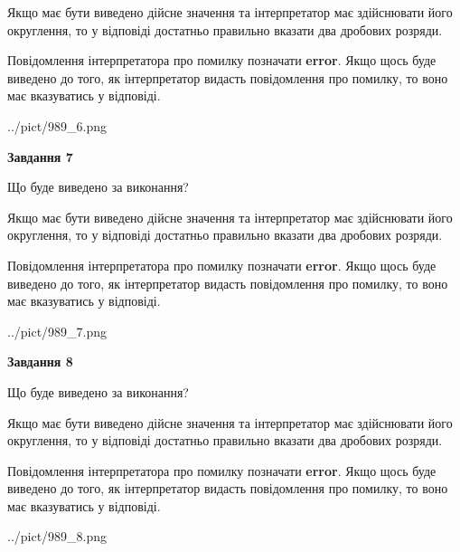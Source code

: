 \documentclass[12pt, ukrainian]{article}
\begin{document}
{\begin {Large}
Якщо має бути виведено дійсне значення та інтерпретатор має здійснювати його округлення, 
то у відповіді достатньо правильно вказати два дробових розряди.

Повідомлення інтерпретатора про помилку позначати \textbf{error}.
Якщо щось буде виведено до того, як інтерпретатор видасть повідомлення про помилку, 
то воно має вказуватись у відповіді. \par

\begin{center}
	{../pict/989_6.png}
\end{center}
\newpage

{\begin {center}\textbf{Завдання 7}\end {center}}\par
Що буде виведено за виконання? \par

Якщо має бути виведено дійсне значення та інтерпретатор має здійснювати його округлення, 
то у відповіді достатньо правильно вказати два дробових розряди.

Повідомлення інтерпретатора про помилку позначати \textbf{error}.
Якщо щось буде виведено до того, як інтерпретатор видасть повідомлення про помилку, 
то воно має вказуватись у відповіді. \par

\begin{center}
	{../pict/989_7.png}
\end{center}
\newpage

{\begin {center}\textbf{Завдання 8}\end {center}}\par
Що буде виведено за виконання? \par

Якщо має бути виведено дійсне значення та інтерпретатор має здійснювати його округлення, 
то у відповіді достатньо правильно вказати два дробових розряди.

Повідомлення інтерпретатора про помилку позначати \textbf{error}.
Якщо щось буде виведено до того, як інтерпретатор видасть повідомлення про помилку, 
то воно має вказуватись у відповіді. \par

\begin{center}
	{../pict/989_8.png}
\end{center}
\newpage


\end{Large}}
\end{document}
